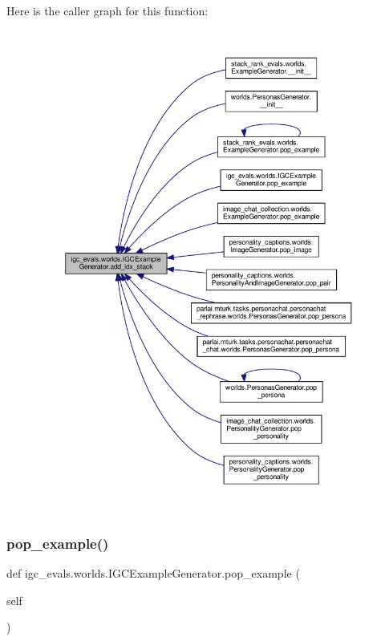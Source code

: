 Here is the caller graph for this function\+:
\nopagebreak
\begin{figure}[H]
\begin{center}
\leavevmode
\includegraphics[width=350pt]{classigc__evals_1_1worlds_1_1IGCExampleGenerator_aa0801aa3a53c7fd57a759c2080936174_icgraph}
\end{center}
\end{figure}
\mbox{\label{classigc__evals_1_1worlds_1_1IGCExampleGenerator_a68420b6b80ae5d3a8825302359371ed5}} 
\subsubsection{\texorpdfstring{pop\+\_\+example()}{pop\_example()}}
{\footnotesize\ttfamily def igc\+\_\+evals.\+worlds.\+I\+G\+C\+Example\+Generator.\+pop\+\_\+example (\begin{DoxyParamCaption}\item[{}]{self }\end{DoxyParamCaption})}



